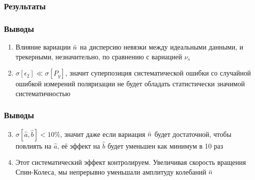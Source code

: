 \documentclass[14pt]{beamer}
\begin{document}
\begin{frame}\frametitle{Результаты}
\end{frame}
\begin{frame}\frametitle{Выводы}
	\begin{enumerate}[<+->]
		\item Влияние вариации $\bar n$ на дисперсию невязки между идеальными данными, и трекерными, незначительно, по сравнению с вариацией $\nu_s$
		\item $\sigma[\epsilon_2] \ll \sigma[P_y]$, значит суперпозиция систематической ошибки со случайной ошибкой измерений поляризации не будет обладать статистически значимой систематичностью
	\end{enumerate}
\end{frame}
\begin{frame}\frametitle{Выводы}
	\begin{enumerate}[<+->] \setcounter{enumi}{2}
		\item $\sigma[\hat a, \hat b] < 10\%$, значит даже если вариация $\bar n$ будет достаточной, чтобы повлиять на $\hat a$, её эффект на $\hat b$ будет уменьшен как минимум в 10 раз
		\item Этот систематический эффект контролируем. Увеличивая скорость вращения Спин-Колеса, мы непрерывно уменьшали амплитуду колебаний $\bar n$
	\end{enumerate}
\end{frame}
\end{document}
